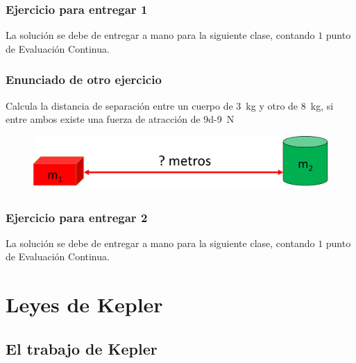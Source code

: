 \documentclass[14pt]{beamer}
\begin{document}
\begin{frame}
\frametitle{Ejercicio para entregar 1}
La solución se debe de entregar a mano para la siguiente clase, contando $1$ punto de Evaluación Continua.
\end{frame}
\begin{frame}
\frametitle{Enunciado de otro ejercicio}
Calcula la distancia de separación entre un cuerpo de \SI{3}{\kilo\gram} y otro de \SI{8}{\kilo\gram}, si entre ambos existe una fuerza de atracción de \SI{9d-9}{\newton}
\begin{figure}
    \centering
    \includegraphics[scale=0.75]{Imagenes/Gravitacion_Universal_03.png}
\end{figure}
\end{frame}
\begin{frame}
\frametitle{Ejercicio para entregar 2}
La solución se debe de entregar a mano para la siguiente clase, contando $1$ punto de Evaluación Continua.
\end{frame}    

\section{Leyes de Kepler}
\subsection{El trabajo de Kepler}
    
\end{document}
